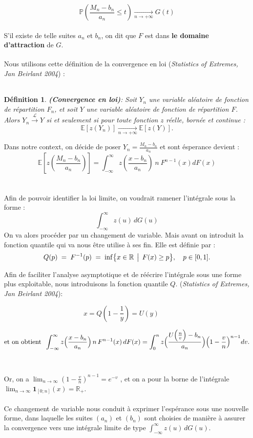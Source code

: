 \documentclass{article}
\theoremstyle{plain}
\newtheorem{definition}{Définition}[section]
\theoremstyle{definition}
\theoremstyle{plain}
\begin{document}
\[
\mathbb{P} \left( \frac{M_n - b_n}{a_n} \le t \right) \xrightarrow[n\to +\infty]{} G(t)
\]
\\
S'il existe de telle suites $a_n$ et $b_n$, on dit que $F$ est dans \textbf{le domaine d'attraction} de $G$.
\\
\\
Nous utilisons cette définition de la convergence en loi (\textit{Statistics of Extremes, Jan Beirlant 2004}) :
\\
\\
\begin{definition}
\textbf{(Convergence en loi)}:
Soit \( Y_n \) une variable aléatoire de fonction de répartition \( F_n \), et soit \( Y \) une variable aléatoire de fonction de répartition \( F \).  
Alors $Y_n \xrightarrow{\mathcal{L} } Y$ si et seulement si pour toute fonction $z$ réelle, bornée et continue :
\[
\mathbb{E}[z(Y_n)] \xrightarrow[n\to +\infty]{} \mathbb{E}[z(Y)].
\]
\end{definition}
\noindent Dans notre context, on décide de poser $Y_n = \frac{M_n -b_n}{a_n}$ et sont ésperance devient : 
\[
\mathbb{E} \left[ z \left( \frac{M_n -b_n}{a_n} \right) \right] = \int_{-\infty}^{\infty} z \left( \frac{x-b_n}{a_n} \right) \: n \:  F^{n-1} (x)dF(x)
\]
\\
\\
Afin de pouvoir identifier la loi limite, on voudrait ramener l'intégrale sous la forme :
\[
\int_{-\infty}^{\infty} z(u) \, dG(u)
\]
On va alors procéder par un changement de variable. Mais avant on introduit la fonction quantile qui va nous être utilise à ses fin. Elle est définie par :
\\
\[
Q(p) \;=\; F^{-1}(p)
\;=\;
\inf\bigl\{x\in\mathbb{R}\,\bigm|\,F(x)\ge p\bigr\},
\quad p\in[0,1].
\]

\noindent Afin de faciliter l’analyse asymptotique et de réécrire l’intégrale sous une forme plus exploitable, nous introduisons la fonction quantile $Q$.
(\textit{Statistics of Extremes, Jan Beirlant 2004}): 

\[
x = Q(1-\frac{1}{y}) = U(y) \; \; \; \; \; \; 
\]

\begin{equation}\label{eq:1.1}
    \text{et on obtient} \; \; \int_{-\infty}^{\infty} z\Bigl(\frac{x-b_n}{a_n}\Bigr) \, n \, F^{n-1}(x)\,dF(x)
    =\int_{0}^{n} z\Bigl(\frac{U\Bigl(\frac{n}{v}\Bigr)-b_n}{a_n}\Bigr)
    \Bigl(1-\frac{v}{n}\Bigr)^{n-1}dv.
\end{equation}
\\
\\
Or, on a $\lim_{n \to \infty} ( 1 - \frac{v}{n})^{n-1} = e^{-v}$ , et on a pour la borne de l'intégrale $\lim_{n \to \infty} \mathbf{1}_{[0;n]}(x) = \mathbb{R}_{+}$.
\\
\\
Ce changement de variable nous conduit à exprimer l’espérance sous une nouvelle forme, dans laquelle les suites $(a_n)$ et $(b_n)$ sont choisies de manière à assurer la convergence vers une intégrale limite de type $\int_{-\infty}^{\infty} z(u)\, dG(u)$.
\end{document}
